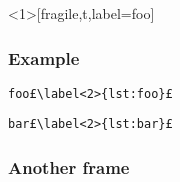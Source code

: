 \documentclass{beamer}
\begin{document}
\begin{frame}<1>[fragile,t,label=foo]
\frametitle{Example}
\begin{minipage}{.45\textwidth}%
\begin{lstlisting}[firstnumber=1,name=fooex]
foo£\label<2>{lst:foo}£
\end{lstlisting}%
\end{minipage}%
\begin{minipage}{.45\textwidth}%
\begin{lstlisting}[firstnumber=2,name=fooex]
bar£\label<2>{lst:bar}£
\end{lstlisting}%
\end{minipage}%


\end{frame}

\begin{frame}
    \frametitle{Another frame}
\end{frame}

\end{document}
